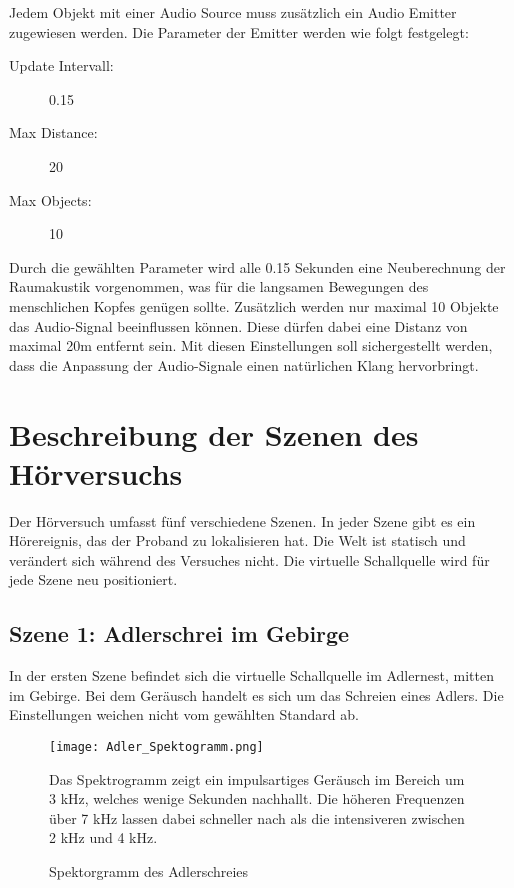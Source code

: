 Jedem Objekt mit einer Audio Source muss zusätzlich ein Audio Emitter zugewiesen werden. Die Parameter der Emitter werden wie folgt festgelegt: 

\begin{description}
\item[Update Intervall:] 0.15 
\item[Max Distance:] 20
\item[Max Objects:] 10
\end{description}

Durch die gewählten Parameter wird alle 0.15 Sekunden eine Neuberechnung der Raumakustik vorgenommen, was für die langsamen Bewegungen des menschlichen Kopfes genügen sollte.  Zusätzlich werden nur maximal 10 Objekte das Audio-Signal beeinflussen können. Diese dürfen dabei eine Distanz von maximal 20m entfernt sein. Mit diesen Einstellungen soll sichergestellt werden, dass die Anpassung der Audio-Signale einen natürlichen Klang hervorbringt. 

\vspace*{40pt}

  \section{Beschreibung der Szenen des Hörversuchs}
Der Hörversuch umfasst fünf verschiedene Szenen. In jeder Szene gibt es ein Hörereignis, das der Proband zu lokalisieren hat. Die Welt ist statisch und verändert sich während des Versuches nicht. Die virtuelle Schallquelle wird für jede Szene neu positioniert. 
\newpage
  \subsection{Szene 1: Adlerschrei im Gebirge}
  In der ersten Szene befindet sich die virtuelle Schallquelle im Adlernest, mitten im Gebirge. Bei dem Geräusch handelt es sich um das Schreien eines Adlers. Die Einstellungen weichen nicht vom gewählten Standard ab. 
  
    \begin{figure}[H]
\centering
\texttt{[image: Adler\_Spektogramm.png]}
\caption{Spektorgramm des Adlerschreies}
Das Spektrogramm zeigt ein impulsartiges Geräusch im Bereich um 3 kHz, welches wenige Sekunden nachhallt. Die höheren Frequenzen über 7 kHz lassen dabei schneller nach als die intensiveren zwischen 2 kHz und 4 kHz. 
\label{fig:Adler_Spektogramm}
\end{figure} 

